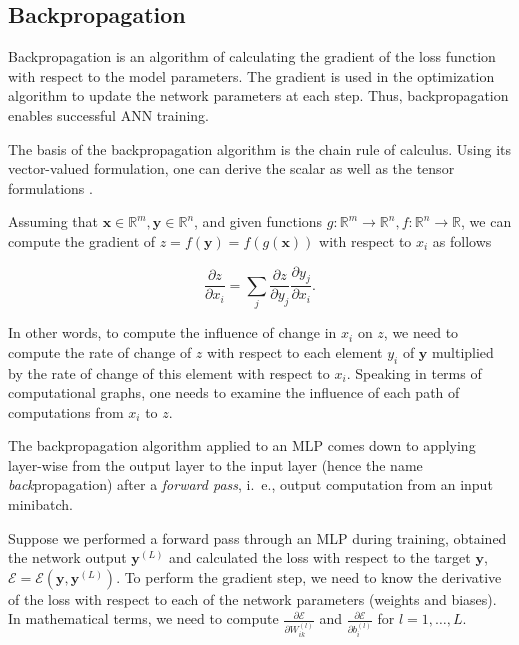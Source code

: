 \subsection*{Backpropagation}

Backpropagation is an algorithm of calculating the gradient of the loss function with respect to the model parameters. The gradient is used in the optimization algorithm to update the network parameters at each step. Thus, backpropagation enables successful \ac{ANN} training.

The basis of the backpropagation algorithm is the chain rule of calculus. Using its vector-valued formulation, one can derive the scalar as well as the tensor formulations \cite{Goodfellow-et-al-2016}.

Assuming that $\pmb{x} \in \mathbb{R}^m, \pmb{y} \in \mathbb{R}^n$, and given functions $g: \mathbb{R}^m \rightarrow \mathbb{R}^n, f: \mathbb{R}^n \rightarrow \mathbb{R}$, we can compute the gradient of $z = f(\pmb{y}) = f(g(\pmb{x}))$ with respect to $x_i$ as follows

\begin{equation}
  \frac{\partial z}{\partial x_i} = \sum \limits_j \frac{\partial z}{\partial y_j} \frac{\partial y_j}{\partial x_i}.
  \label{eq:chain_rule_of_calculus}
\end{equation}

In other words, to compute the influence of change in $x_i$ on $z$, we need to compute the rate of change of $z$ with respect to each element $y_i$ of $\pmb{y}$ multiplied by the rate of change of this element with respect to $x_i$. Speaking in terms of computational graphs, one needs to examine the influence of each path of computations from $x_i$ to $z$.

The backpropagation algorithm applied to an \ac{MLP} comes down to applying  layer-wise from the output layer to the input layer (hence the name \emph{back}propagation) after a \emph{forward pass}, i.\ e., output computation from an input minibatch.

Suppose we performed a forward pass through an \ac{MLP} during training, obtained the network output $\pmb{y}^{(L)}$ and calculated the loss with respect to the target $\pmb{y}$, $\mathcal{E} = \mathcal{E}(\pmb{y},\pmb{y}^{(L)})$. To perform the gradient step, we need to know the derivative of the loss with respect to each of the network parameters (weights and biases). In mathematical terms, we need to compute $\frac{\partial \mathcal{E}}{\partial W_{ik}^{(l)}}$ and $\frac{\partial \mathcal{E}}{\partial b_{i}^{(l)}}$ for $l=1,\dots,L$.

